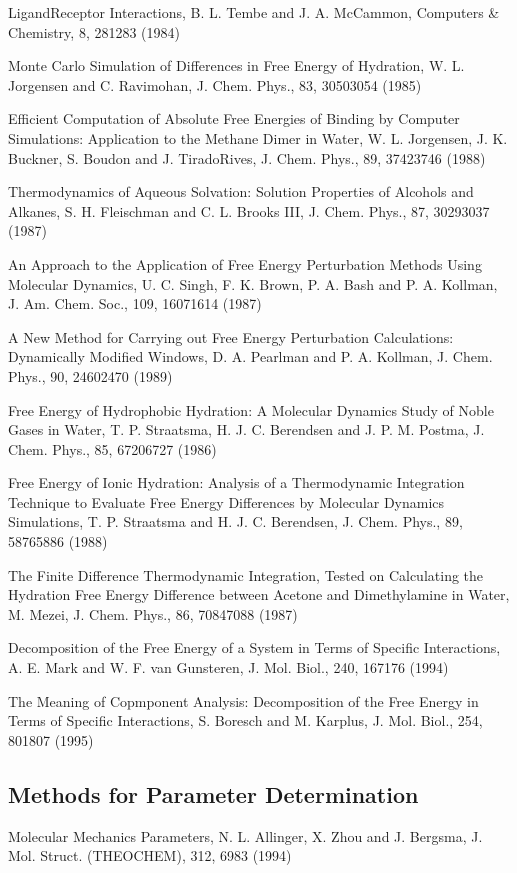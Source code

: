 \documentclass[letterpaper,11pt,english]{sphinxmanual}
\begin{document}
Ligand\sphinxhyphen{}Receptor Interactions, B. L. Tembe and J. A. McCammon, Computers \& Chemistry, 8, 281\sphinxhyphen{}283 (1984)

Monte Carlo Simulation of Differences in Free Energy of Hydration, W. L. Jorgensen and C. Ravimohan, J. Chem. Phys., 83, 3050\sphinxhyphen{}3054 (1985)

Efficient Computation of Absolute Free Energies of Binding by Computer Simulations:  Application to the Methane Dimer in Water, W. L. Jorgensen, J. K. Buckner, S. Boudon and J. Tirado\sphinxhyphen{}Rives, J. Chem. Phys., 89, 3742\sphinxhyphen{}3746 (1988)

Thermodynamics of Aqueous Solvation:  Solution Properties of Alcohols and Alkanes, S. H. Fleischman and C. L. Brooks III, J. Chem. Phys., 87, 3029\sphinxhyphen{}3037 (1987)

An Approach to the Application of Free Energy Perturbation Methods Using Molecular Dynamics, U. C. Singh, F. K. Brown, P. A. Bash and P. A. Kollman, J. Am. Chem. Soc., 109, 1607\sphinxhyphen{}1614 (1987)

A New Method for Carrying out Free Energy Perturbation Calculations: Dynamically Modified Windows, D. A. Pearlman and P. A. Kollman, J. Chem. Phys., 90, 2460\sphinxhyphen{}2470 (1989)

Free Energy of Hydrophobic Hydration:  A Molecular Dynamics Study of Noble Gases in Water, T. P. Straatsma, H. J. C. Berendsen and J. P. M. Postma, J. Chem. Phys., 85, 6720\sphinxhyphen{}6727 (1986)

Free Energy of Ionic Hydration:  Analysis of a Thermodynamic Integration Technique to Evaluate Free Energy Differences by Molecular Dynamics Simulations, T. P. Straatsma and H. J. C. Berendsen, J. Chem. Phys., 89, 5876\sphinxhyphen{}5886 (1988)

The Finite Difference Thermodynamic Integration, Tested on Calculating the Hydration Free Energy Difference between Acetone and Dimethylamine in Water, M. Mezei, J. Chem. Phys., 86, 7084\sphinxhyphen{}7088 (1987)

Decomposition of the Free Energy of a System in Terms of Specific Interactions, A. E. Mark and W. F. van Gunsteren, J. Mol. Biol., 240, 167\sphinxhyphen{}176 (1994)

The Meaning of Copmponent Analysis: Decomposition of the Free Energy in Terms of Specific Interactions, S. Boresch and M. Karplus, J. Mol. Biol., 254, 801\sphinxhyphen{}807 (1995)


\subsection{Methods for Parameter Determination}
\label{\detokenize{text/references:methods-for-parameter-determination}}
Molecular Mechanics Parameters, N. L. Allinger, X. Zhou and J. Bergsma, J. Mol. Struct. (THEOCHEM), 312, 69\sphinxhyphen{}83 (1994)
\end{document}
